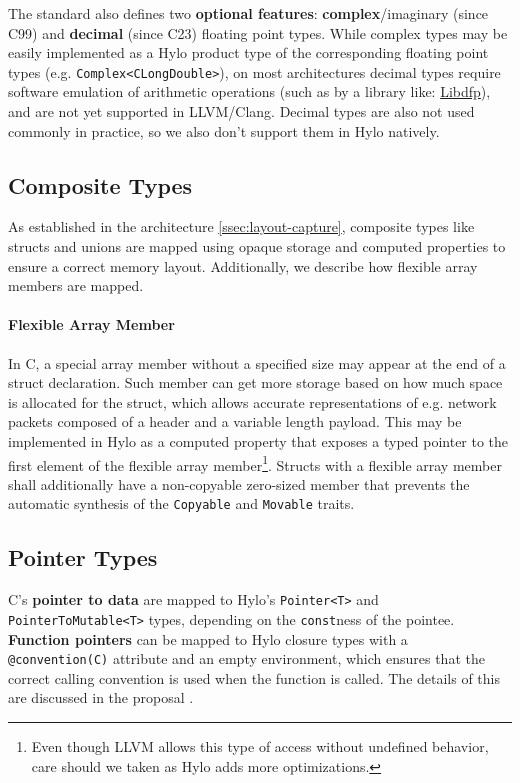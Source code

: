 The standard also defines two \textbf{optional features}: \textbf{complex}/imaginary (since C99) and \textbf{decimal} (since C23) floating point types. While complex types may be easily implemented as a Hylo product type of the corresponding floating point types (e.g. \texttt{Complex<CLongDouble>}), on most architectures decimal types require software emulation of arithmetic operations (such as by a library like: \href{https://github.com/libdfp/libdfp}{Libdfp}), and are not yet supported in LLVM/Clang\cite{no-support-llvm-decimals}. Decimal types are also not used commonly in practice, so we also don't support them in Hylo natively.

\subsection{Composite Types}
As established in the architecture \autoref{ssec:layout-capture}, composite types like structs and unions are mapped using opaque storage and computed properties to ensure a correct memory layout. Additionally, we describe how flexible array members are mapped.

\paragraph{
Flexible Array Member
    }
    \label{par:fam}
    In C, a special array member without a specified size may appear at the end of a struct declaration. Such member can get more storage based on how much space is allocated for the struct, which allows accurate representations of e.g. network packets composed of a header and a variable length payload. This may be implemented in Hylo as a computed property that exposes a typed pointer to the first element of the flexible array member\footnote{Even though LLVM allows this type of access without undefined behavior, care should we taken as Hylo adds more optimizations.}. Structs with a flexible array member shall additionally have a non-copyable zero-sized member that prevents the automatic synthesis of the \texttt{Copyable} and \texttt{Movable} traits.

\subsection{Pointer Types}
C's \textbf{pointer to data} are mapped to Hylo's \texttt{Pointer<T>} and \texttt{PointerToMutable<T>} types, depending on the \texttt{const}ness of the pointee. \textbf{Function pointers} can be mapped to Hylo closure types with a \texttt{@convention(C)} attribute and an empty environment, which ensures that the correct calling convention is used when the function is called. The details of this are discussed in the proposal \cite{hylo-function-pointers}.

